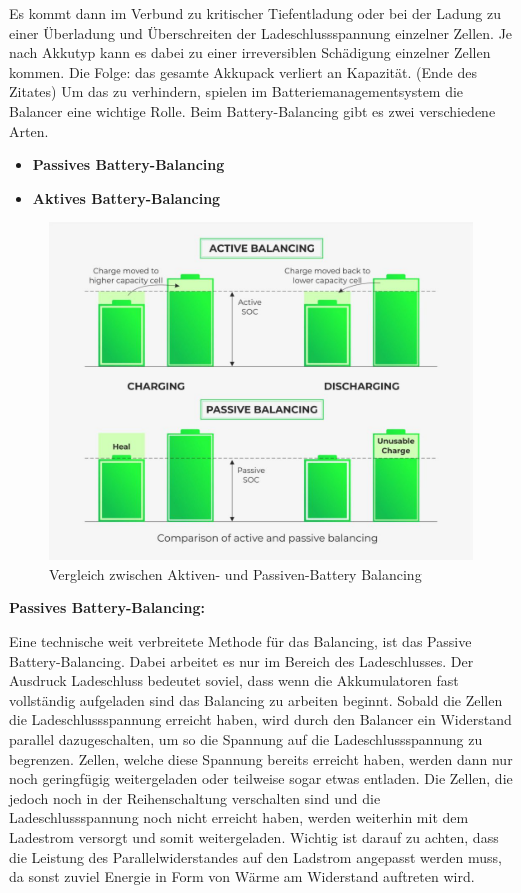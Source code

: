 Es kommt dann im Verbund zu kritischer Tiefentladung oder bei der Ladung zu einer Überladung und Überschreiten der Ladeschlussspannung einzelner Zellen. Je nach Akkutyp kann es dabei zu einer irreversiblen Schädigung einzelner Zellen kommen. Die Folge: das gesamte Akkupack verliert an Kapazität. (Ende des Zitates)
Um das zu verhindern, spielen im Batteriemanagementsystem die Balancer eine wichtige Rolle. Beim Battery-Balancing gibt es zwei verschiedene Arten. 
\begin{itemize}
\item \textbf{Passives Battery-Balancing}
\item \textbf{Aktives Battery-Balancing} \medskip\\
\end{itemize}

\begin{figure}[H]
	\begin{center}
		\includegraphics[scale=1.5]{figures/Akku/Vergleichaktivespassives.jpg}
		\caption{Vergleich zwischen Aktiven- und Passiven-Battery Balancing}
	\end{center}
\end{figure}
\newpage

\textbf{Passives Battery-Balancing:}

Eine technische weit verbreitete Methode für das Balancing, ist das Passive Battery-Balancing. Dabei arbeitet es nur im Bereich des Ladeschlusses. Der Ausdruck Ladeschluss bedeutet soviel, dass wenn die Akkumulatoren fast vollständig aufgeladen sind das Balancing zu arbeiten beginnt. Sobald die Zellen die Ladeschlussspannung erreicht haben, wird durch den Balancer ein Widerstand parallel dazugeschalten, um so die Spannung auf die Ladeschlussspannung zu begrenzen. Zellen, welche diese Spannung bereits erreicht haben, werden dann nur noch geringfügig weitergeladen oder teilweise sogar etwas entladen. Die Zellen, die jedoch noch in der Reihenschaltung verschalten sind und die Ladeschlussspannung noch nicht erreicht haben, werden weiterhin mit dem Ladestrom versorgt und somit weitergeladen. Wichtig ist darauf zu achten, dass die Leistung des Parallelwiderstandes auf den Ladstrom angepasst werden muss, da sonst zuviel Energie in Form von Wärme am Widerstand auftreten wird.

